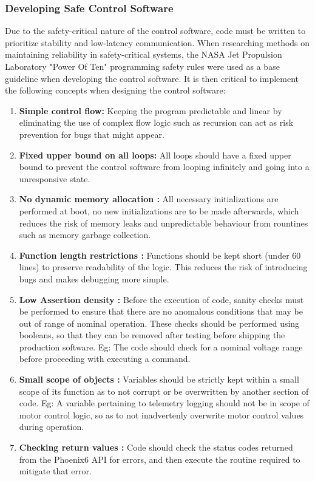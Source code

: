 \documentclass[12pt]{article}
\begin{document}
\subsubsection{Developing Safe Control Software}
Due to the safety-critical nature of the control software, code must be written to prioritize stability and low-latency communication. 
When researching methods on maintaining reliability in safety-critical systems, the NASA Jet Propulsion Laboratory "Power Of Ten" programming safety rules were used as a base guideline when developing the control software.
It is then critical to implement the following concepts when designing the control software:
\begin{enumerate}
\item \textbf{Simple control flow:} Keeping the program predictable and linear by eliminating the use of complex flow logic such as recursion can act as risk prevention for bugs that might appear.
\item \textbf{Fixed upper bound on all loops:} All loops should have a fixed upper bound to prevent the control software from looping infinitely and going into a unresponsive state. 
\item \textbf{No dynamic memory allocation :} All necessary initializations are performed at boot, no new initializations are to be made afterwards, which reduces the risk of memory leaks and unpredictable behaviour from rountines such as memory garbage collection.
\item \textbf{Function length restrictions :} Functions should be kept short (under 60 lines) to preserve readability of the logic. This reduces the risk of introducing bugs and makes debugging more simple.
\item \textbf{Low Assertion density :} Before the execution of code, sanity checks must be performed to ensure that there are no anomalous conditions that may be out of range of nominal operation. These checks should be performed using booleans, so that they can be removed after testing before shipping the production software. Eg: The code should check for a nominal voltage range before proceeding with executing a command.
\item \textbf{Small scope of objects :} Variables should be strictly kept within a small scope of its function as to not corrupt or be overwritten by another section of code. Eg: A variable pertaining to telemetry logging should not be in scope of motor control logic, so as to not inadvertenly overwrite motor control values during operation.
\item \textbf{Checking return values :} Code should check the status codes returned from the Phoenix6 API for errors, and then execute the routine required to mitigate that error.

\end{enumerate}
\end{document}
